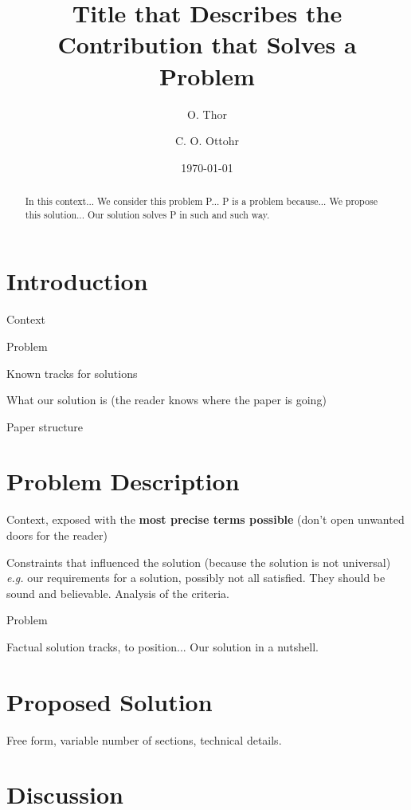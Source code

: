 \documentclass[a4paper,11pt,twocolumn,twoside]{article}
\begin{document}
\title{Title that Describes the Contribution that Solves a Problem}
\author{O. Thor \and C. O. Ottohr}
\date{\today}
\maketitle

\begin{abstract}
In this context...
We consider this problem P...
P is a problem because...
We propose this solution...
Our solution solves P in such and such way.
\end{abstract}


\section{Introduction}
\label{sec:intro}

Context

Problem

Known tracks for solutions

What our solution is (the reader knows where the paper is going)

Paper structure


\section{Problem Description}
\label{sec:problem}

Context, exposed with the \textbf{most precise terms possible} (don't open
unwanted doors for the reader)

Constraints that influenced the solution (because the solution is not
universal) \emph{e.g.} our requirements for a solution, possibly not all
satisfied. They should be sound and believable. Analysis of the criteria.

Problem

Factual solution tracks, to position...
Our solution in a nutshell.


\section{Proposed Solution}
\label{sec:contribution}

Free form, variable number of sections, technical details.


\section{Discussion}
\label{sec:discussion}
\end{document}
